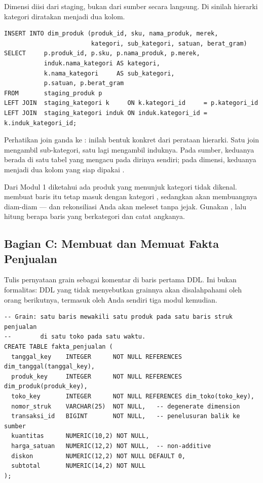 
Dimensi diisi dari staging, bukan dari sumber secara langsung. Di sinilah
hierarki kategori diratakan menjadi dua kolom.

\begin{lstlisting}[style=sqlgaya]
INSERT INTO dim_produk (produk_id, sku, nama_produk, merek,
                        kategori, sub_kategori, satuan, berat_gram)
SELECT     p.produk_id, p.sku, p.nama_produk, p.merek,
           induk.nama_kategori AS kategori,
           k.nama_kategori     AS sub_kategori,
           p.satuan, p.berat_gram
FROM       staging_produk p
LEFT JOIN  staging_kategori k     ON k.kategori_id     = p.kategori_id
LEFT JOIN  staging_kategori induk ON induk.kategori_id = k.induk_kategori_id;
\end{lstlisting}

Perhatikan join ganda ke : inilah bentuk konkret
dari perataan hierarki. Satu join mengambil sub-kategori, satu lagi mengambil
induknya. Pada sumber, keduanya berada di satu tabel yang mengacu pada dirinya
sendiri; pada dimensi, keduanya menjadi dua kolom yang siap dipakai
.

\begin{peringatan}
Dari Modul 1 diketahui ada produk yang menunjuk kategori tidak dikenal.
 membuat baris itu tetap masuk dengan kategori
, sedangkan  akan membuangnya diam-diam ---
dan rekonsiliasi Anda akan meleset tanpa jejak. Gunakan ,
lalu hitung berapa baris yang berkategori  dan catat angkanya.
\end{peringatan}

\subsection{Bagian C: Membuat dan Memuat Fakta Penjualan}


Tulis pernyataan grain sebagai komentar di baris pertama DDL. Ini bukan
formalitas: DDL yang tidak menyebutkan grainnya akan disalahpahami oleh orang
berikutnya, termasuk oleh Anda sendiri tiga modul kemudian.

\begin{lstlisting}[style=sqlgaya]
-- Grain: satu baris mewakili satu produk pada satu baris struk penjualan
--        di satu toko pada satu waktu.
CREATE TABLE fakta_penjualan (
  tanggal_key    INTEGER      NOT NULL REFERENCES dim_tanggal(tanggal_key),
  produk_key     INTEGER      NOT NULL REFERENCES dim_produk(produk_key),
  toko_key       INTEGER      NOT NULL REFERENCES dim_toko(toko_key),
  nomor_struk    VARCHAR(25)  NOT NULL,   -- degenerate dimension
  transaksi_id   BIGINT       NOT NULL,   -- penelusuran balik ke sumber
  kuantitas      NUMERIC(10,2) NOT NULL,
  harga_satuan   NUMERIC(12,2) NOT NULL,  -- non-additive
  diskon         NUMERIC(12,2) NOT NULL DEFAULT 0,
  subtotal       NUMERIC(14,2) NOT NULL
);
\end{lstlisting}

